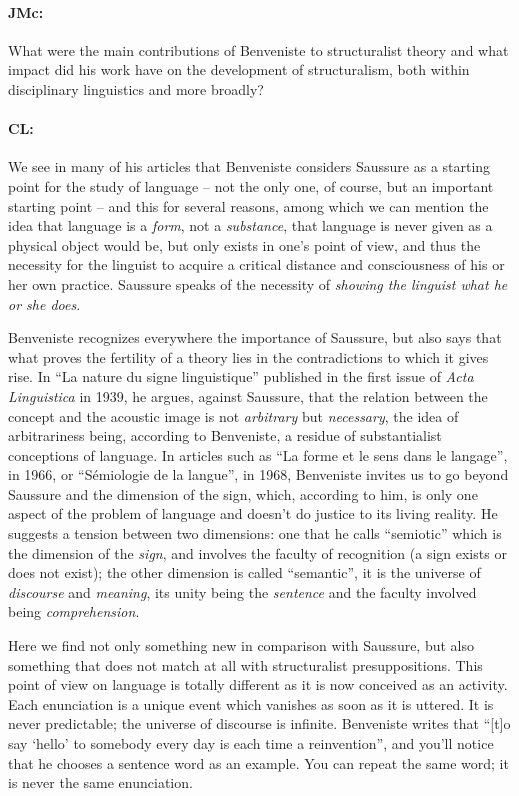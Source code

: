 \documentclass[output=paper]{langscibook}
\begin{document}
\paragraph*{JMc:} What were the main contributions of Benveniste to structuralist theory and what impact did his work have on the development of structuralism, both within disciplinary linguistics and more broadly?

\paragraph*{CL:} We see in many of his articles that Benveniste considers Saussure as a starting point for the study of language – not the only one, of course, but an important starting point – and this for several reasons, among which we can mention the idea that language is a \textit{form}, not a \textit{substance}, that language is never given as a physical object would be, but only exists in one’s point of view, and thus the necessity for the linguist to acquire a critical distance and consciousness of his or her own practice. Saussure speaks of the necessity of \textit{showing the linguist what he or she does}.

Benveniste recognizes everywhere the importance of Saussure, but also says that what proves the fertility of a theory lies in the contradictions to which it gives rise. In “La nature du signe linguistique” published in the first issue of \textit{Acta Linguistica} in 1939, he argues, against Saussure, that the relation between the concept and the acoustic image is not \textit{arbitrary} but \textit{necessary}, the idea of arbitrariness being, according to Benveniste, a residue of substantialist conceptions of language. In articles such as “La forme et le sens dans le langage”, in 1966, or “Sémiologie de la langue”, in 1968, Benveniste invites us to go beyond Saussure and the dimension of the sign, which, according to him, is only one aspect of the problem of language and doesn’t do justice to its living reality. He suggests a tension between two dimensions: one that he calls ``semiotic'' which is the dimension of the \textit{sign}, and involves the faculty of recognition (a sign exists or does not exist); the other dimension is called ``semantic'', it is the universe of \textit{discourse} and \textit{meaning}, its unity being the \textit{sentence} and the faculty involved being \textit{comprehension}.

Here we find not only something new in comparison with Saussure, but also something that does not match at all with structuralist presuppositions. This point of view on language is totally different as it is now conceived as an activity. Each enunciation is a unique event which vanishes as soon as it is uttered. It is never predictable; the universe of discourse is infinite. Benveniste writes that “[t]o say ‘hello’ to somebody every day is each time a reinvention”, and you’ll notice that he chooses a sentence word as an example. You can repeat the same word; it is never the same enunciation.
\end{document}
